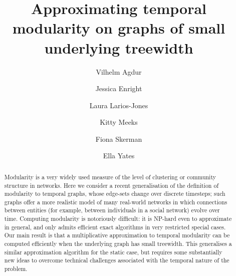 \documentclass[runningheads]{llncs}
\date{}
\begin{document}
%
\title{Approximating temporal modularity on graphs of small underlying treewidth}
%
%
\author{Vilhelm Agdur \and
Jessica Enright \and Laura Larios-Jones \and Kitty Meeks \and Fiona Skerman \and Ella Yates}
%
%
\maketitle              %
%
\begin{abstract}
Modularity is a very widely used measure of the level of clustering or community structure in networks.  
Here we consider a recent generalisation of the definition of modularity to temporal graphs, whose edge-sets change over discrete timesteps; such graphs offer a more realistic model of many real-world networks in which connections between entities (for example, between individuals in a social network) evolve over time.  
Computing modularity is notoriously difficult: it is NP-hard even to approximate in general, and only admits efficient exact algorithms in very restricted special cases. 
Our main result is that a multiplicative approximation to temporal modularity can be computed efficiently when the underlying graph has small treewidth.  This generalises a similar approximation algorithm for the static case, but requires some substantially new ideas to overcome technical challenges associated with the temporal nature of the problem.


\end{abstract}
%
%
%
\end{document}
